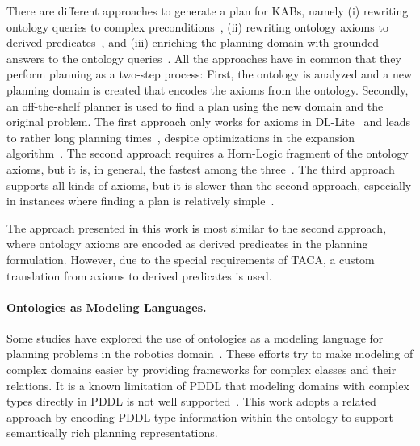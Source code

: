 There are different approaches to generate a plan for KABs, namely (i) rewriting ontology queries to complex preconditions~\cite{DBLP:conf/ijcai/CalvaneseMPS16}, (ii) rewriting ontology axioms to derived predicates~\cite{DBLP:conf/aaai/Borgwardt0KKNS22}, and (iii) enriching the planning domain with grounded answers to the ontology queries~\cite{DBLP:conf/ecai/JohnK24}. All the approaches have in common that they perform planning as a two-step process: First, the ontology is analyzed and a new planning domain is created that encodes the axioms from the ontology. Secondly, an off-the-shelf planner is used to find a plan using the new domain and the original problem. The first approach only works for axioms in DL-Lite~\cite{DBLP:conf/ijcai/CalvaneseMPS16} and leads to rather long planning times~\cite{DBLP:conf/aaai/Borgwardt0KKNS22}, despite optimizations in the expansion algorithm~\cite{DBLP:conf/kr/Borgwardt0KS21}. The second approach requires a Horn-Logic fragment of the ontology axioms, but it is, in general, the fastest among the three~\cite{DBLP:conf/aaai/Borgwardt0KKNS22, DBLP:conf/ecai/JohnK24}. The third approach supports all kinds of axioms, but it is slower than the second approach, especially in instances where finding a plan is relatively simple~\cite{DBLP:conf/ecai/JohnK24}.

The approach presented in this work is most similar to the second approach, where ontology axioms are encoded as derived predicates in the planning formulation. However, due to the special requirements of TACA, a custom translation from axioms to derived predicates is used.

\paragraph{Ontologies as Modeling Languages.} Some studies have explored the use of ontologies as a modeling language for planning problems in the robotics domain~\cite{DBLP:journals/ras/BalakirskyKKPSG13,DBLP:journals/ewc/BorgoCOU19}. These efforts try to make modeling of complex domains easier by providing frameworks for complex classes and their relations. It is a known limitation of PDDL that modeling domains with complex types directly in PDDL is not well supported~\cite{GOLDMANpddlTypeProblems2012}. This work adopts a related approach by encoding PDDL type information within the ontology to support semantically rich planning representations.


